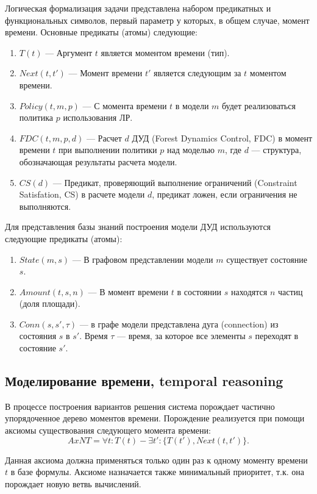 Логическая формализация задачи представлена набором предикатных и функциональных символов, первый параметр у которых, в общем случае, момент времени. Основные предикаты (атомы) следующие:
\begin{enumerate}
\item{$T(t)$} --- Аргумент $t$ является моментом времени (тип).
\item{$Next(t,t')$} --- Момент времени $t'$ является следующим за $t$ моментом времени.
\item{$Policy(t,m,p)$} --- С момента времени $t$ в модели $m$ будет реализоваться политика $p$ использования ЛР.
\item{$FDC(t,m,p,d)$} --- Расчет $d$ ДУД (Forest Dynamics Control, FDC) в момент времени $t$ при выполнении политики $p$ над моделью $m$, где $d$ --- структура, обозначающая результаты расчета модели.
\item{$CS(d)$} --- Предикат, проверяющий выполнение ограничений (Constraint Satisfation, CS) в расчете модели $d$, предикат ложен, если ограничения не выполняются.
\end{enumerate}

Для представления базы знаний построения модели ДУД используются следующие предикаты (атомы):
\begin{enumerate}
\item{$State(m, s)$} --- В графовом представлении модели $m$ существует состояние $s$.
\item{$Amount(t, s, n)$} --- В момент времени $t$ в состоянии $s$ находятся $n$ частиц (доля площади).
\item{$Conn(s, s', \tau{})$} --- в графе модели представлена дуга (connection) из состояния $s$ в $s'$. Время $\tau{}$ --- время, за которое все элементы $s$ переходят в состояние $s'$.
\end{enumerate}

\subsection{Моделирование времени, temporal reasoning}
В процессе построения вариантов решения система порождает частично упорядоченное дерево моментов времени. Порождение реализуется при помощи аксиомы существования следующего момента времени:
$$
AxNT = \forall{t}:T(t) - \exists{t'}:\{T(t'),Next(t,t')\}.
$$

Данная аксиома должна применяться только один раз к одному моменту времени $t$ в базе формулы. Аксиоме назначается также минимальный приоритет, т.к. она порождает новую ветвь вычислений.

